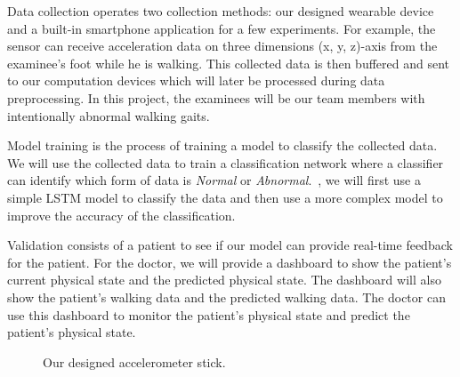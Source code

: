 \documentclass[10pt,twocolumn,letterpaper]{article}
\begin{document}
Data collection operates two collection methods: our designed wearable device and a built-in smartphone application for a few experiments. For example, the sensor can receive acceleration data on three dimensions (x, y, z)-axis from the examinee's foot while he is walking. This collected data is then buffered and sent to our computation devices which will later be processed during data preprocessing. In this project, the examinees will be our team members with intentionally abnormal walking gaits.

Model training is the process of training a model to classify the collected data. We will use the collected data to train a classification network where a classifier can identify which form of data is \textit{Normal} or \textit{Abnormal}.~\cite{s21020614, 8789488}, we will first use a simple LSTM model to classify the data and then use a more complex model to improve the accuracy of the classification.

Validation consists of a patient to see if our model can provide real-time feedback for the patient. For the doctor, we will provide a dashboard to show the patient's current physical state and the predicted physical state. The dashboard will also show the patient's walking data and the predicted walking data. The doctor can use this dashboard to monitor the patient's physical state and predict the patient's physical state.

\begin{figure}[t]
    \centering
    \caption{Our designed accelerometer stick.}
    \label{fig:f5}
\end{figure}
\end{document}
